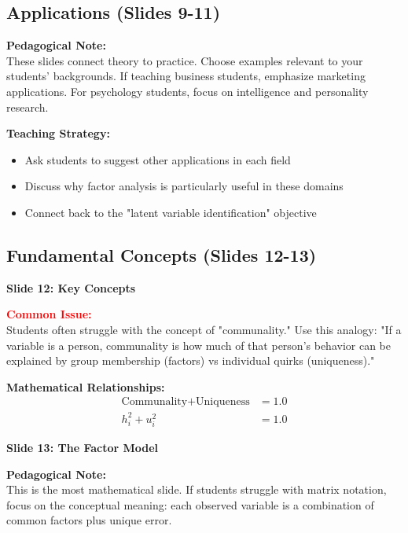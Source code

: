 \documentclass[11pt,a4paper]{article}
\newenvironment{pedagogicalnote}{%
  \begin{framed}
  \noindent\textbf{Pedagogical Note:}\\
}{\end{framed}}
\newenvironment{commonissue}{%
  \begin{framed}
  \noindent\textcolor{red}{\textbf{Common Issue:}}\\
}{\end{framed}}
\begin{document}
\subsection{Applications (Slides 9-11)}

\begin{pedagogicalnote}
These slides connect theory to practice. Choose examples relevant to your students' backgrounds. If teaching business students, emphasize marketing applications. For psychology students, focus on intelligence and personality research.
\end{pedagogicalnote}

\textbf{Teaching Strategy:} 
\begin{itemize}
    \item Ask students to suggest other applications in each field
    \item Discuss why factor analysis is particularly useful in these domains
    \item Connect back to the "latent variable identification" objective
\end{itemize}

\subsection{Fundamental Concepts (Slides 12-13)}

\textbf{Slide 12: Key Concepts}

\begin{commonissue}
Students often struggle with the concept of "communality." Use this analogy: "If a variable is a person, communality is how much of that person's behavior can be explained by group membership (factors) vs individual quirks (uniqueness)."
\end{commonissue}

\textbf{Mathematical Relationships:}
\begin{align}
    \text{Communality} + \text{Uniqueness} &= 1.0 \\
    h^2_i + u^2_i &= 1.0
\end{align}

\textbf{Slide 13: The Factor Model}

\begin{pedagogicalnote}
This is the most mathematical slide. If students struggle with matrix notation, focus on the conceptual meaning: each observed variable is a combination of common factors plus unique error.
\end{pedagogicalnote}
\end{document}

